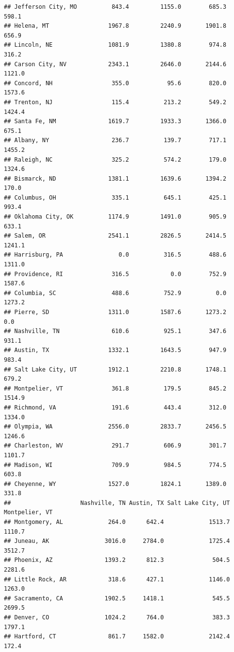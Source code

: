 \documentclass[
]{article}
\begin{document}
\begin{verbatim}
## Jefferson City, MO          843.4         1155.0        685.3      598.1
## Helena, MT                 1967.8         2240.9       1901.8      656.9
## Lincoln, NE                1081.9         1380.8        974.8      316.2
## Carson City, NV            2343.1         2646.0       2144.6     1121.0
## Concord, NH                 355.0           95.6        820.0     1573.6
## Trenton, NJ                 115.4          213.2        549.2     1424.4
## Santa Fe, NM               1619.7         1933.3       1366.0      675.1
## Albany, NY                  236.7          139.7        717.1     1455.2
## Raleigh, NC                 325.2          574.2        179.0     1324.6
## Bismarck, ND               1381.1         1639.6       1394.2      170.0
## Columbus, OH                335.1          645.1        425.1      993.4
## Oklahoma City, OK          1174.9         1491.0        905.9      633.1
## Salem, OR                  2541.1         2826.5       2414.5     1241.1
## Harrisburg, PA                0.0          316.5        488.6     1311.0
## Providence, RI              316.5            0.0        752.9     1587.6
## Columbia, SC                488.6          752.9          0.0     1273.2
## Pierre, SD                 1311.0         1587.6       1273.2        0.0
## Nashville, TN               610.6          925.1        347.6      931.1
## Austin, TX                 1332.1         1643.5        947.9      983.4
## Salt Lake City, UT         1912.1         2210.8       1748.1      679.2
## Montpelier, VT              361.8          179.5        845.2     1514.9
## Richmond, VA                191.6          443.4        312.0     1334.0
## Olympia, WA                2556.0         2833.7       2456.5     1246.6
## Charleston, WV              291.7          606.9        301.7     1101.7
## Madison, WI                 709.9          984.5        774.5      603.8
## Cheyenne, WY               1527.0         1824.1       1389.0      331.8
##                    Nashville, TN Austin, TX Salt Lake City, UT Montpelier, VT
## Montgomery, AL             264.0      642.4             1513.7         1110.7
## Juneau, AK                3016.0     2784.0             1725.4         3512.7
## Phoenix, AZ               1393.2      812.3              504.5         2281.6
## Little Rock, AR            318.6      427.1             1146.0         1263.0
## Sacramento, CA            1902.5     1418.1              545.5         2699.5
## Denver, CO                1024.2      764.0              383.3         1797.1
## Hartford, CT               861.7     1582.0             2142.4          172.4

\end{verbatim}
\end{document}

